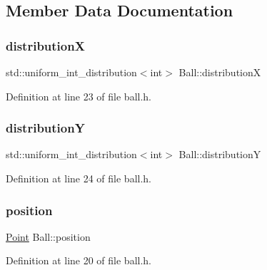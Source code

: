 \subsection{Member Data Documentation}
\mbox{\label{class_ball_a558a48196bdb4ea389519ab7c0138216}} 
\subsubsection{\texorpdfstring{distributionX}{distributionX}}
{\footnotesize\ttfamily std\+::uniform\+\_\+int\+\_\+distribution$<$int$>$ Ball\+::distributionX\hspace{0.3cm}{\ttfamily [private]}}



Definition at line 23 of file ball.\+h.

\mbox{\label{class_ball_a9a8e67dcc49382448848c497ff7ede25}} 
\subsubsection{\texorpdfstring{distributionY}{distributionY}}
{\footnotesize\ttfamily std\+::uniform\+\_\+int\+\_\+distribution$<$int$>$ Ball\+::distributionY\hspace{0.3cm}{\ttfamily [private]}}



Definition at line 24 of file ball.\+h.

\mbox{\label{class_ball_abd10a53eda37a2c541ad5dfbbea27f81}} 
\subsubsection{\texorpdfstring{position}{position}}
{\footnotesize\ttfamily \mbox{\hyperlink{common_8h_aa9cfdb80b4ca12013a2de8a3b9b97981}{Point}} Ball\+::position\hspace{0.3cm}{\ttfamily [private]}}



Definition at line 20 of file ball.\+h.

\mbox{\label{class_ball_ae3c68e21e0801b657b980380ab6a4bb2}} 
